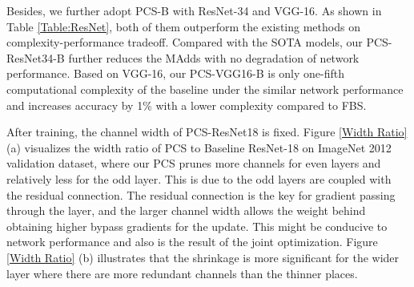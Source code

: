\documentclass[lettersize,journal]{IEEEtran}
\begin{document}
Besides, we further adopt PCS-B with ResNet-34 and VGG-16. As shown in Table \ref{Table:ResNet}, both of them outperform the existing methods on complexity-performance tradeoff. Compared with the SOTA models, our PCS-ResNet34-B further reduces the MAdds with no degradation of network performance. Based on VGG-16, our PCS-VGG16-B is only one-fifth computational complexity of the baseline under the similar network performance and increases accuracy by 1\% with a lower complexity compared to FBS.

After training, the channel width of PCS-ResNet18 is fixed. Figure \ref{Width Ratio} (a) visualizes the width ratio of PCS to Baseline ResNet-18 on ImageNet 2012 validation dataset, where our PCS prunes more channels for even layers and relatively less for the odd layer. This is due to the odd layers are coupled with the residual connection. The residual connection is the key for gradient passing through the layer, and the larger channel width allows the weight behind obtaining higher bypass gradients for the update. This might be conducive to network performance and also is the result of the joint optimization.
Figure \ref{Width Ratio} (b) illustrates that the shrinkage is more significant for the wider layer where there are more redundant channels than the thinner places. 
\end{document}
